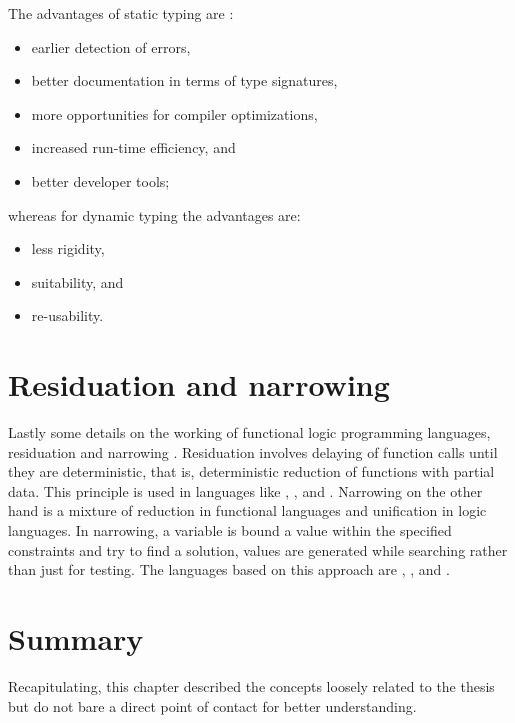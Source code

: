 \documentclass[proposal.tex]{subfiles}
\begin{document}
The advantages of static typing \cite{meijer2004static} are :
\begin{itemize}
\item earlier detection of errors,
\item better documentation in terms of type signatures,
\item more opportunities for compiler optimizations,
\item increased run-time efficiency, and
\item better developer tools;
\end{itemize}

whereas for dynamic typing the advantages are:
\begin{itemize}
\item less rigidity,
\item suitability, and
\item re-usability.
\end{itemize}

\section{Residuation and narrowing}
Lastly some details on the working of functional logic programming languages, residuation and narrowing
\cite{hanus1995curry,webiste:wikicurry}.
Residuation involves delaying of function calls until they are deterministic, that is, deterministic reduction of
functions with partial data.
This principle is used in languages like  \cite{lloyd1999programming:escher}, 
\cite{website:life},  \cite{website:nue-prolog} and  \cite{website:oz-mozart}.
Narrowing on the other hand is a mixture of reduction in functional languages and unification in logic languages.
In narrowing, a variable is bound a value within the specified constraints and try to find a solution, values are
generated while searching rather than just for testing.
The languages based on this approach are  \cite{website:alf},  \cite{website:babel},
 \cite{bert1987lpg} and  \cite{website:curry}.


\section{Summary}
Recapitulating, this chapter described the concepts loosely related to the thesis but do not bare a direct point of
contact for better understanding.
\end{document}
